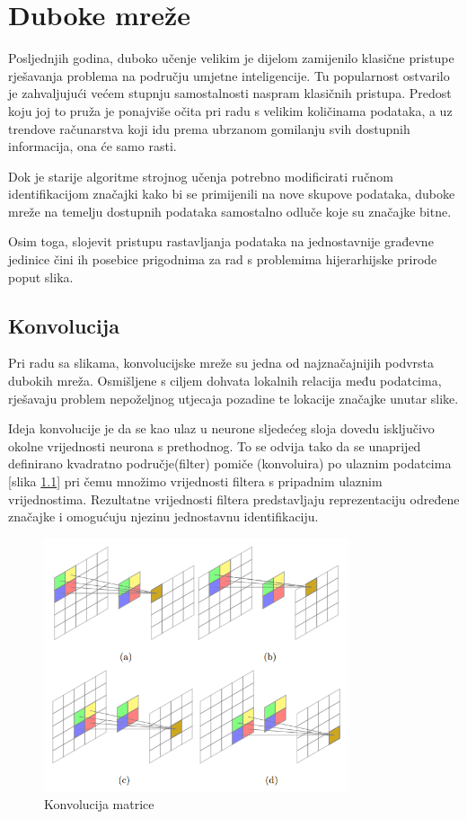 \documentclass[lmodern, utf8, seminar]{fer}
\begin{document}
\chapter{Duboke mreže}
Posljednjih godina, duboko učenje velikim je dijelom zamijenilo klasične pristupe rješavanja problema na području umjetne inteligencije. Tu popularnost ostvarilo je zahvaljujući većem stupnju samostalnosti naspram klasičnih pristupa. Predost koju joj to pruža je ponajviše očita pri radu s velikim količinama podataka, a uz trendove računarstva koji idu prema ubrzanom gomilanju svih dostupnih informacija, ona će samo rasti.

Dok je starije algoritme strojnog učenja potrebno modificirati ručnom identifikacijom značajki kako bi se primijenili na nove skupove podataka, duboke mreže na temelju dostupnih podataka samostalno odluče koje su značajke bitne. 

Osim toga, slojevit pristupu rastavljanja podataka na jednostavnije građevne jedinice čini ih posebice prigodnima za rad s problemima hijerarhijske prirode poput slika. 
\newline


\section{Konvolucija}
Pri radu sa slikama, konvolucijske mreže su jedna od najznačajnijih podvrsta dubokih mreža. Osmišljene s ciljem dohvata lokalnih relacija među podatcima, rješavaju problem nepoželjnog utjecaja pozadine te lokacije značajke unutar slike. 

Ideja konvolucije je da se kao ulaz u neurone sljedećeg sloja dovedu isključivo okolne vrijednosti neurona s prethodnog. To se odvija tako da se unaprijed definirano kvadratno područje(filter) pomiče (konvoluira) po ulaznim podatcima  [slika \ref{fig:convolution}] pri čemu množimo vrijednosti filtera s pripadnim ulaznim vrijednostima. Rezultatne vrijednosti filtera predstavljaju reprezentaciju određene značajke i omogućuju njezinu jednostavnu identifikaciju.
\newline

\begin{figure}[H]
    \centering
    \includegraphics[width=0.8\textwidth]{convolution}
    \caption{Konvolucija matrice}
    \label{fig:convolution}
\end{figure}
\end{document}
